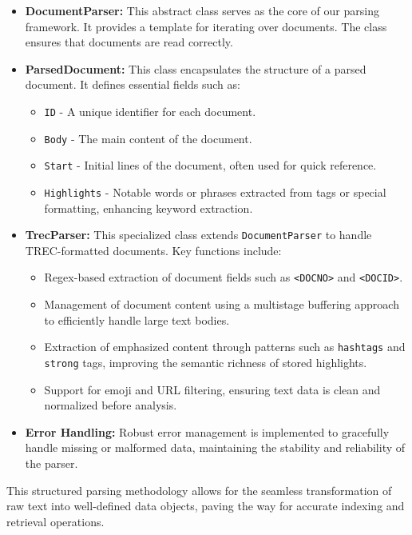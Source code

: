 \begin{itemize}

\item \textbf{DocumentParser:} This abstract class serves as the core of our parsing framework. It provides a template for iterating over documents. The class ensures that documents are read correctly.

\item \textbf{ParsedDocument:} This class encapsulates the structure of a parsed document. It defines essential fields such as:
  \begin{itemize}
    \item \texttt{ID} - A unique identifier for each document.
    \item \texttt{Body} - The main content of the document.
    \item \texttt{Start} - Initial lines of the document, often used for quick reference.
    \item \texttt{Highlights} - Notable words or phrases extracted from tags or special formatting, enhancing keyword extraction.
  \end{itemize}

\item \textbf{TrecParser:} This specialized class extends \texttt{DocumentParser} to handle TREC-formatted documents. Key functions include:
  \begin{itemize}
    \item Regex-based extraction of document fields such as \texttt{<DOCNO>} and \texttt{<DOCID>}.
    \item Management of document content using a multistage buffering approach to efficiently handle large text bodies.
    \item Extraction of emphasized content through patterns such as \texttt{hashtags} and \texttt{strong} tags, improving the semantic richness of stored highlights.
    \item Support for emoji and URL filtering, ensuring text data is clean and normalized before analysis.
  \end{itemize}

\item \textbf{Error Handling:} Robust error management is implemented to gracefully handle missing or malformed data, maintaining the stability and reliability of the parser.

\end{itemize}

This structured parsing methodology allows for the seamless transformation of raw text into well-defined data objects, paving the way for accurate indexing and retrieval operations.



